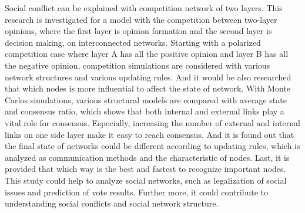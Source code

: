 

\begin{englishabstract}
Social conflict can be explained with competition network of two layers. This research is investigated for a model with the competition between two-layer opinions, where the first layer is opinion formation and the second layer is decision making, on interconnected networks. Starting with a polarized competition case where layer A has all the positive opinion and layer B has all the negative opinion, competition simulations are considered with various network structures and various updating rules. And it would be also researched that which nodes is more influential to affect the state of network. With Monte Carlos simulations, various structural models are compared with average state and consensus ratio, which shows that both internal and external links play a vital role for consensus. Especially, increasing the number of external and internal links on one side layer make it easy to reach consensus. And it is found out that the final state of networks could be different according to updating rules, which is analyzed as communication methods and the characteristic of nodes. Last, it is provided that which way is the best and fastest to recognize important nodes. This study could help to analyze social networks, such as legalization of social issues and prediction of vote results. Further more, it could contribute to understanding social conflicts and social network structure.
\end{englishabstract}

